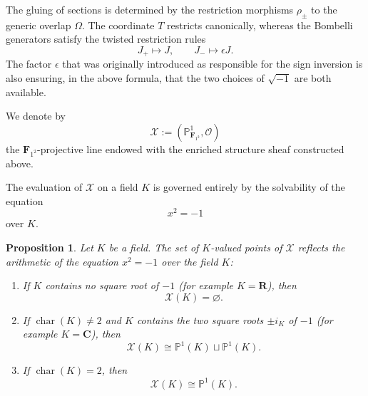 \documentclass[11pt,a4paper]{article}
\newtheorem{proposition}[theorem]{Proposition}
\newcommand{\C}{\mathbf{C}}
\renewcommand{\P}{\mathbb{P}}
\newcommand{\R}{\mathbf{R}}
\newcommand{\Ftwo}{\mathbf{F}_{1^2}}
\begin{document}
The gluing  of sections is determined by the restriction
morphisms $\rho_{\pm}$ to the generic overlap $\Omega$. The coordinate $T$ restricts
canonically, whereas the Bombelli generators satisfy the twisted restriction
rules
\begin{equation}\label{eq:restriction_maps}
J_+\longmapsto J,
\qquad
J_-\longmapsto\epsilon J.
\end{equation}
The factor $\epsilon$ that was originally introduced as responsible for the sign inversion is also ensuring, in the above formula,  that the two choices of $\sqrt{-1}$ are both available.\vspace{.05in}



We denote by
\begin{equation}\label{X}
\mathcal X:=(\P^1_{\Ftwo},\mathcal O)
\end{equation}
the $\Ftwo$-projective line endowed with the enriched structure sheaf constructed
above.\vspace{.05in}

The evaluation of $\mathcal X$ on a field $K$ is governed entirely by the
solvability of the equation
\[
x^2=-1
\]
over $K$.

\begin{proposition}\label{prop:points_X_K}
Let $K$ be a field. The set of $K$-valued points of $\mathcal X$ reflects the arithmetic of the equation
$
x^2=-1
$
over the field $K$:
\begin{enumerate}
\item If $K$ contains no square root of $-1$ (for example $K=\R$), then
\[
\mathcal X(K)=\varnothing.
\]
\item If $\operatorname{char}(K)\neq2$ and $K$ contains the two square roots
$\pm i_K$ of $-1$ (for example $K=\C$), then
\[
\mathcal X(K)\cong \P^1(K)\sqcup\P^1(K).
\]
\item If $\operatorname{char}(K)=2$, then
\[
\mathcal X(K)\cong\P^1(K).
\]
\end{enumerate}
\end{proposition}
\end{document}
